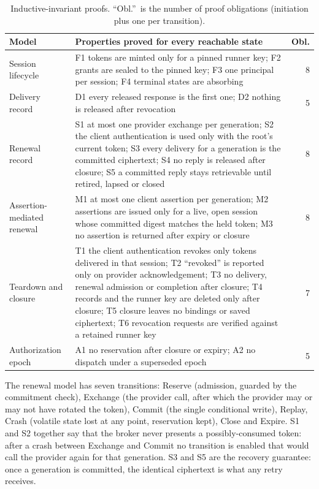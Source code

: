 \documentclass[11pt]{article}
\begin{document}
\begin{table}[t]
\centering
\small
\begin{tabular}{@{}p{}p{}r@{}}
\toprule
Model & Properties proved for every reachable state & Obl. \\
\midrule
Session lifecycle & F1 tokens are minted only for a pinned runner key; F2 grants are sealed to the pinned key; F3 one principal per session; F4 terminal states are absorbing & 8 \\
Delivery record & D1 every released response is the first one; D2 nothing is released after revocation & 5 \\
Renewal record & S1 at most one provider exchange per generation; S2 the client authentication is used only with the root's current token; S3 every delivery for a generation is the committed ciphertext; S4 no reply is released after closure; S5 a committed reply stays retrievable until retired, lapsed or closed & 8 \\
Assertion-mediated renewal & M1 at most one client assertion per generation; M2 assertions are issued only for a live, open session whose committed digest matches the held token; M3 no assertion is returned after expiry or closure & 8 \\
Teardown and closure & T1 the client authentication revokes only tokens delivered in that session; T2 ``revoked'' is reported only on provider acknowledgement; T3 no delivery, renewal admission or completion after closure; T4 records and the runner key are deleted only after closure; T5 closure leaves no bindings or saved ciphertext; T6 revocation requests are verified against a retained runner key & 7 \\
Authorization epoch & A1 no reservation after closure or expiry; A2 no dispatch under a superseded epoch & 5 \\
\bottomrule
\end{tabular}
\caption{Inductive-invariant proofs. ``Obl.''\ is the number of proof obligations (initiation plus one per transition).}
\label{tab:smt}
\end{table}

The renewal model has seven transitions: \textsf{Reserve} (admission, guarded by the commitment check), \textsf{Exchange} (the provider call, after which the provider may or may not have rotated the token), \textsf{Commit} (the single conditional write), \textsf{Replay}, \textsf{Crash} (volatile state lost at any point, reservation kept), \textsf{Close} and \textsf{Expire}. S1 and S2 together say that the broker never presents a possibly-consumed token: after a crash between \textsf{Exchange} and \textsf{Commit} no transition is enabled that would call the provider again for that generation. S3 and S5 are the recovery guarantee: once a generation is committed, the identical ciphertext is what any retry receives.
\end{document}
